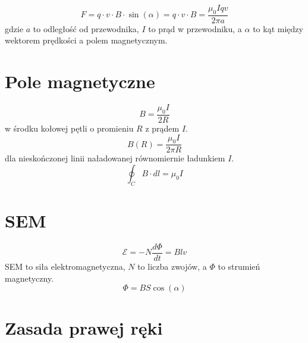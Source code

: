 \documentclass{../konspekt}
\begin{document}
\begin{multicols}{2}
  $$
  F = q \cdot v \cdot B \cdot \sin(\alpha) = q \cdot v \cdot B =
  \frac{\mu_0 I q v}{2\pi a}
  $$
  gdzie $a$ to odległość od przewodnika, $I$ to prąd w przewodniku,
  a $\alpha$ to kąt między wektorem prędkości a polem magnetycznym.

  \section{Pole magnetyczne}

  $$
  B = \frac{\mu_0 I}{2 R}
  $$
  w środku kołowej pętli o promieniu $R$ z prądem $I$.
  $$
  B(R) = \frac{\mu_0 I}{2\pi R}
  $$
  dla nieskończonej linii naładowanej równomiernie ładunkiem $I$.
  $$
  \oint_{C} B \cdot dl = \mu_0 I
  $$

  \section{SEM}

  $$
  \mathcal{E} = -N \frac{d \Phi}{dt} = Blv
  $$
  SEM to siła elektromagnetyczna, $N$ to liczba zwojów, a $\Phi$
  to strumień magnetyczny.
  $$
  \Phi = BS \cos(\alpha)
  $$

  \section{Zasada prawej ręki}

  \begin{center}
  \end{center}

\end{multicols}
\end{document}
